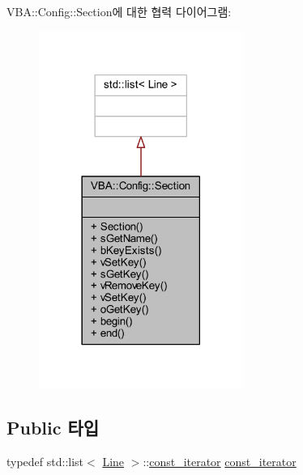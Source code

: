 V\+BA\+:\+:Config\+:\+:Section에 대한 협력 다이어그램\+:\nopagebreak
\begin{figure}[H]
\begin{center}
\leavevmode
\includegraphics[width=189pt]{class_v_b_a_1_1_config_1_1_section__coll__graph}
\end{center}
\end{figure}
\subsection*{Public 타입}
\begin{DoxyCompactItemize}
\item 
typedef std\+::list$<$ \mbox{\hyperlink{class_v_b_a_1_1_config_1_1_line}{Line}} $>$\+::\mbox{\hyperlink{class_v_b_a_1_1_config_1_1_section_a79d4303068448425b08175c0d2dacfab}{const\+\_\+iterator}} \mbox{\hyperlink{class_v_b_a_1_1_config_1_1_section_a79d4303068448425b08175c0d2dacfab}{const\+\_\+iterator}}
\end{DoxyCompactItemize}
